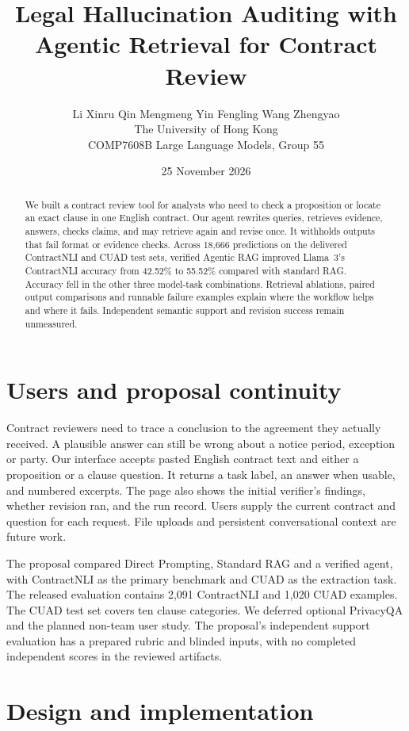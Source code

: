 \documentclass{article}
\title{Legal Hallucination Auditing with Agentic Retrieval for Contract Review}
\author{Li Xinru \quad Qin Mengmeng \quad Yin Fengling \quad Wang Zhengyao\\
The University of Hong Kong\\
COMP7608B Large Language Models, Group 55}
\date{25 November 2026}
\begin{document}
\maketitle

\begin{abstract}
We built a contract review tool for analysts who need to check a proposition or locate an exact clause in one English contract. Our agent rewrites queries, retrieves evidence, answers, checks claims, and may retrieve again and revise once. It withholds outputs that fail format or evidence checks. Across 18,666 predictions on the delivered ContractNLI and CUAD test sets, verified Agentic RAG improved Llama~3's ContractNLI accuracy from 42.52\% to 55.52\% compared with standard RAG. Accuracy fell in the other three model-task combinations. Retrieval ablations, paired output comparisons and runnable failure examples explain where the workflow helps and where it fails. Independent semantic support and revision success remain unmeasured.
\end{abstract}

\section{Users and proposal continuity}
Contract reviewers need to trace a conclusion to the agreement they actually received. A plausible answer can still be wrong about a notice period, exception or party. Our interface accepts pasted English contract text and either a proposition or a clause question. It returns a task label, an answer when usable, and numbered excerpts. The page also shows the initial verifier's findings, whether revision ran, and the run record. Users supply the current contract and question for each request. File uploads and persistent conversational context are future work.

The proposal compared Direct Prompting, Standard RAG and a verified agent, with ContractNLI \citep{koreeda2021} as the primary benchmark and CUAD \citep{hendrycks2021} as the extraction task. The released evaluation contains 2,091 ContractNLI and 1,020 CUAD examples. The CUAD test set covers ten clause categories. We deferred optional PrivacyQA and the planned non-team user study. The proposal's independent support evaluation has a prepared rubric and blinded inputs, with no completed independent scores in the reviewed artifacts.

\section{Design and implementation}
\end{document}
